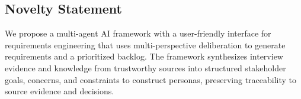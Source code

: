 \subsection{Novelty Statement}
\label{sec:novelty}

We propose a multi-agent AI framework with a user-friendly interface for requirements engineering that uses multi-perspective deliberation to generate requirements and a prioritized backlog. The framework synthesizes interview evidence and knowledge from trustworthy sources into structured stakeholder goals, concerns, and constraints to construct personas, preserving traceability to source evidence and decisions.
